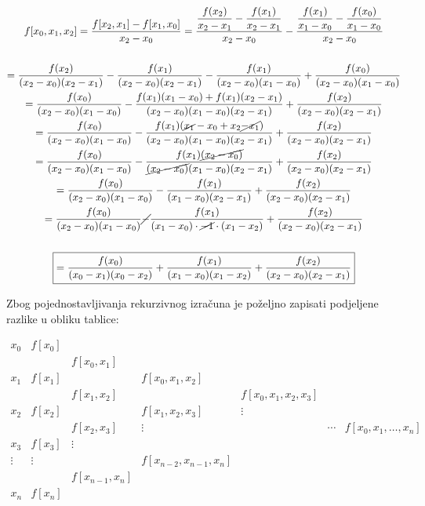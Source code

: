 \begin{gather*}
    f[x_0, x_1, x_2] = \frac{f[x_2,x_1]-f[x_1,x_0]}{x_2 - x_0} = \frac{\displaystyle\frac{f(x_2)}{x_2 - x_1}-\frac{f(x_1)}{x_2 - x_1}}{x_2 - x_0}-\frac{\displaystyle\frac{f(x_1)}{x_1 - x_0}-\frac{f(x_0)}{x_1 - x_0}}{x_2 - x_0}\\\\
    = \frac{f(x_2)}{(x_2-x_0)(x_2-x_1)}-\frac{f(x_1)}{(x_2-x_0)(x_2-x_1)}-\frac{f(x_1)}{(x_2-x_0)(x_1-x_0)}+\frac{f(x_0)}{(x_2-x_0)(x_1-x_0)}\\
    = \frac{f(x_0)}{(x_2-x_0)(x_1-x_0)}-\frac{f(x_1)(x_1-x_0)+f(x_1)(x_2-x_1)}{(x_2-x_0)(x_1-x_0)(x_2-x_1)}+\frac{f(x_2)}{(x_2-x_0)(x_2-x_1)}\\
    = \frac{f(x_0)}{(x_2-x_0)(x_1-x_0)}-\frac{f(x_1)(\cancel{x_1}-x_0+x_2\cancel{-x_1})}{(x_2-x_0)(x_1-x_0)(x_2-x_1)}+\frac{f(x_2)}{(x_2-x_0)(x_2-x_1)}\\
    = \frac{f(x_0)}{(x_2-x_0)(x_1-x_0)}-\frac{f(x_1)\cancel{(x_2-x_0)}}{\cancel{(x_2-x_0)}(x_1-x_0)(x_2-x_1)}+\frac{f(x_2)}{(x_2-x_0)(x_2-x_1)}\\
    = \frac{f(x_0)}{(x_2-x_0)(x_1-x_0)}-\frac{f(x_1)}{(x_1-x_0)(x_2-x_1)}+\frac{f(x_2)}{(x_2-x_0)(x_2-x_1)}\\
    = \frac{f(x_0)}{(x_2-x_0)(x_1-x_0)}\cancel{-}\frac{f(x_1)}{(x_1-x_0)\cdot\cancel{-1}\cdot(x_1-x_2)}+\frac{f(x_2)}{(x_2-x_0)(x_2-x_1)}\\\\
    \boxed{
    = \frac{f(x_0)}{(x_0-x_1)(x_0-x_2)}+\frac{f(x_1)}{(x_1-x_0)(x_1-x_2)}+\frac{f(x_2)}{(x_2-x_0)(x_2-x_1)}
    }
\end{gather*}

\newpage

Zbog pojednostavljivanja rekurzivnog izračuna je poželjno zapisati podjeljene razlike u obliku tablice:

\begin{tablebox}
    $$
    \begin{array}{ccccccc}
        x_0 & f[x_0] \\
        & & f[x_0, x_1] \\
        x_1 & f[x_1] & & f[x_0, x_1, x_2] \\
        & & f[x_1, x_2] & & f[x_0, x_1, x_2, x_3] \\
        x_2 & f[x_2] & & f[x_1, x_2, x_3] & \vdots \\
        & & f[x_2, x_3] & \vdots & & \cdots & f[x_0, x_1, \dots, x_n] \\
        x_3 & f[x_3] & \vdots \\
        \vdots & \vdots & & f[x_{n-2}, x_{n-1}, x_n] \\
        & & f[x_{n-1}, x_n] \\
        x_n & f[x_n] \\
    \end{array}
    $$
\end{tablebox}

